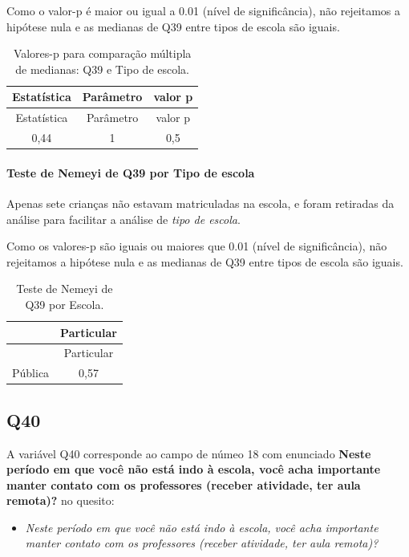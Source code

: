 \documentclass[]{article}
\providecommand{\tightlist}{%
  \setlength{\itemsep}{0pt}\setlength{\parskip}{0pt}}
\let\oldparagraph\paragraph
\renewcommand{\paragraph}[1]{\oldparagraph{#1}\mbox{}}
\begin{document}
Como o valor-p é maior ou igual a 0.01 (nível de significância), não rejeitamos a hipótese nula e as medianas de Q39 entre tipos de escola são iguais.

\begin{longtable}[]{@{}ccc@{}}
\caption{\label{tab:unnamed-chunk-1534}Valores-p para comparação múltipla de medianas: Q39 e Tipo de escola.}\tabularnewline
\toprule
Estatística & Parâmetro & valor p\tabularnewline
\midrule
\endfirsthead
\toprule
Estatística & Parâmetro & valor p\tabularnewline
\midrule
\endhead
0,44 & 1 & 0,5\tabularnewline
\bottomrule
\end{longtable}

\hypertarget{teste-de-nemeyi-de-q39-por-tipo-de-escola}{%
\paragraph{Teste de Nemeyi de Q39 por Tipo de escola}\label{teste-de-nemeyi-de-q39-por-tipo-de-escola}}

Apenas sete crianças não estavam matriculadas na escola, e foram retiradas da análise para facilitar a análise de \emph{tipo de escola}.

Como os valores-p são iguais ou maiores que 0.01 (nível de significância), não rejeitamos a hipótese nula e as medianas de Q39 entre tipos de escola são iguais.

\begin{longtable}[]{@{}lc@{}}
\caption{\label{tab:unnamed-chunk-1536}Teste de Nemeyi de Q39 por Escola.}\tabularnewline
\toprule
& Particular\tabularnewline
\midrule
\endfirsthead
\toprule
& Particular\tabularnewline
\midrule
\endhead
Pública & 0,57\tabularnewline
\bottomrule
\end{longtable}

\cleardoublepage

\hypertarget{q40}{%
\subsection{Q40}\label{q40}}

A variável Q40 corresponde ao campo de númeo 18 com enunciado \textbf{Neste período em que você não está indo à escola, você acha importante manter contato com os professores (receber atividade, ter aula remota)?} no quesito:

\begin{itemize}
\tightlist
\item
  \emph{Neste período em que você não está indo à escola, você acha importante manter contato com os professores (receber atividade, ter aula remota)?}
\end{itemize}
\end{document}
